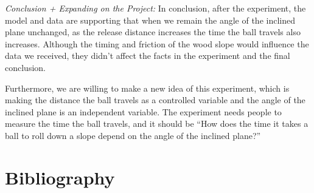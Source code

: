 \documentclass[12pt]{report}
\begin{document}
\emph{Conclusion + Expanding on the Project:}
In conclusion, after the experiment, the model and data are supporting that when we remain the angle of the inclined plane unchanged, as the release distance increases the time the ball travels also increases. Although the timing and friction of the wood slope would influence the data we received, they didn’t affect the facts in the experiment and the final conclusion.

Furthermore, we are willing to make a new idea of this experiment, which is making the distance the ball travels as a controlled variable and the angle of the inclined plane is an independent variable. The experiment needs people to measure the time the ball travels, and it should be “How does the time it takes a ball to roll down a slope depend on the angle of the inclined plane?”
\section{Bibliography}
\end{document}
